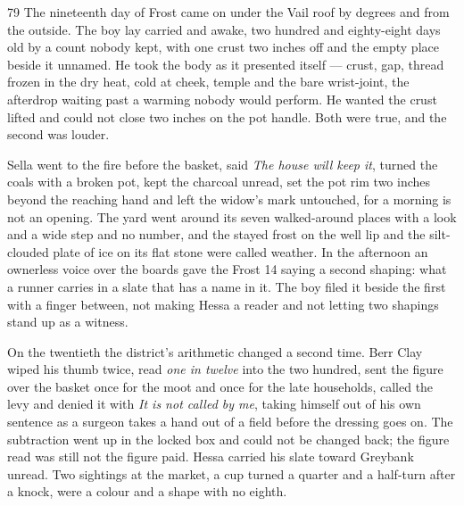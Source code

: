 
\scenebreak


\scenebreak


\scenebreak

\CRtailpiece
\begin{CRchronicle}{79}
The nineteenth day of Frost came on under the Vail roof by degrees and from the outside. The boy lay carried and awake, two hundred and eighty-eight days old by a count nobody kept, with one crust two inches off and the empty place beside it unnamed. He took the body as it presented itself — crust, gap, thread frozen in the dry heat, cold at cheek, temple and the bare wrist-joint, the afterdrop waiting past a warming nobody would perform. He wanted the crust lifted and could not close two inches on the pot handle. Both were true, and the second was louder.

Sella went to the fire before the basket, said \emph{The house will keep it}, turned the coals with a broken pot, kept the charcoal unread, set the pot rim two inches beyond the reaching hand and left the widow’s mark untouched, for a morning is not an opening. The yard went around its seven walked-around places with a look and a wide step and no number, and the stayed frost on the well lip and the silt-clouded plate of ice on its flat stone were called weather. In the afternoon an ownerless voice over the boards gave the Frost 14 saying a second shaping: what a runner carries in a slate that has a name in it. The boy filed it beside the first with a finger between, not making Hessa a reader and not letting two shapings stand up as a witness.

On the twentieth the district’s arithmetic changed a second time. Berr Clay wiped his thumb twice, read \emph{one in twelve} into the two hundred, sent the figure over the basket once for the moot and once for the late households, called the levy and denied it with \emph{It is not called by me}, taking himself out of his own sentence as a surgeon takes a hand out of a field before the dressing goes on. The subtraction went up in the locked box and could not be changed back; the figure read was still not the figure paid. Hessa carried his slate toward Greybank unread. Two sightings at the market, a cup turned a quarter and a half-turn after a knock, were a colour and a shape with no eighth.


\end{CRchronicle}

